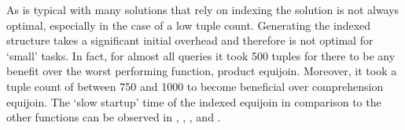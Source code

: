 As is typical with many solutions that rely on indexing the solution is not
always optimal, especially in the case of a low tuple count. Generating the
indexed structure takes a significant initial overhead and therefore is not
optimal for `small' tasks. In fact, for almost all queries it took 500 tuples
for there to be any benefit over the worst performing function, product
equijoin. Moreover, it took a tuple count of between 750 and 1000 to become
beneficial over comprehension equijoin. The `slow startup' time of the indexed
equijoin in comparison to the other functions can be observed in
, 
,
,
and .

